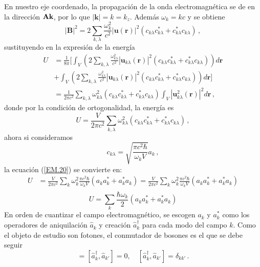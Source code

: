 En nuestro eje coordenado, la propagación de la onda electromagnética se de en la dirección $\mathbf{\hat{\textnormal{\bfseries k}}}$, por lo que $|\mathbf{k}| = k = k_z$. Además $\omega_k = kc$ y se obtiene
\begin{equation}
\label{EM.19}
|\mathbf{B}|^2 = 2 \sum_{k,\lambda} \frac{\omega_k^2}{c^2}  |\mathbf{u}(\mathbf{r})|^2 \left( c_{k\lambda} c_{k\lambda}^* + c_{k\lambda}^* c_{k\lambda} \right) \,,
\end{equation}
sustituyendo en la expresión de la energía
\begin{align*}
U & = \frac{1}{8\pi} \Bigg[ \int_V \left( 2\sum_{k,\lambda} \frac{\omega_{k\lambda}^2}{c^2}  |\mathbf{u}_{k\lambda}(\mathbf{r})|^2 \left( c_{k\lambda} c_{k\lambda}^* + c_{k\lambda}^* c_{k\lambda} \right) \right) d\mathbf{r} \\ &+ \int_V \left( 2 \sum_{k,\lambda} \frac{\omega_{k\lambda}^2}{c^2} |\mathbf{u}_{k\lambda}(\mathbf{r})|^2 \left( c_{k\lambda} c_{k\lambda}^* + c_{k\lambda}^* c_{k\lambda} \right) \right)d\mathbf{r} \Bigg] \\
& = \frac{1}{2\pi c^2} \sum_{k,\lambda} \omega_{k\lambda}^2 \left( c_{k\lambda} c_{k\lambda}^* + c_{k\lambda}^* c_{k\lambda} \right) \int_V |\mathbf{u}_{k\lambda}^2(\mathbf{r})|^2 d\mathbf{r} \,,
\end{align*}
donde por la condición de ortogonalidad, la energía es
\begin{equation}
\label{EM.20}
U = \frac{V}{2\pi c^2}\sum_{k,\lambda} \omega_{k\lambda}^2 \left( c_{k\lambda} c_{k\lambda}^* + c_{k\lambda}^* c_{k\lambda} \right) \,,
\end{equation}
ahora si consideramos
\begin{equation}
\label{EM.21}	
c_{k\lambda} = \sqrt{\frac{\pi c^{2}\hbar}{\omega_{k}V}} a_{k}\,,
\end{equation}
la ecuaci\'on (\ref{EM.20}) se convierte en:
\begin{align*}
U &= \frac{V}{2\pi c^2}\sum_{k} \omega_{k}^2 \frac{\pi c^{2}\hbar}{\omega_{k}V}\left(a_{k}a^{*}_{k} + a_{k}^{*} a_{k} \right) = \frac{V}{2\pi c^2}\sum_{k} \omega_{k}^2 \frac{\pi c^{2}\hbar}{\omega_{k}V}\left(a_{k}a^{*}_{k} + a_{k}^{*} a_{k} \right)\\ 
\end{align*}
\begin{equation}
\label{EM.22}
U = \sum_{k} \frac{\hbar\omega_{k}}{2}\left(a_{k}a^{*}_{k} + a_{k}^{*} a_{k} \right)
\end{equation}
En orden de cuantizar el campo electromagnético, se escogen $a_{k}$ y $a^{*}_{k}$ como los operadores de aniquilaci\'on $\hat{a}_{k}$ y creaci\'on $\hat{a}^{\dagger}_{k}$ para cada modo del campo $k$. Como el objeto de estudio son fotones, el conmutador de bosones es el que se debe seguir
\begin{equation*}
	[\hat{a}_k, \hat{a}^{\dagger}_{k'}] = [\hat{a}^{\dagger}_k, \hat{a}_{k'}] = 0, \quad [\hat{a}^{\dagger}_k, \hat{a}_{k'}] = \delta_{kk'} \,.
\end{equation*}

